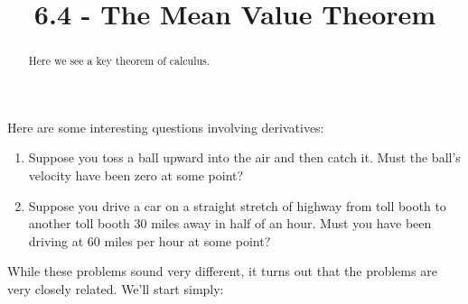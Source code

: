 \documentclass{ximera}
\title{6.4 - The Mean Value Theorem}
\begin{document}
\begin{abstract}
  Here we see a key theorem of calculus.
\end{abstract}
\maketitle


Here are some interesting questions involving derivatives:

\begin{enumerate}
\item Suppose you toss a ball upward into the air and then catch it. Must the
  ball's  velocity have been zero at some point?
\item Suppose you drive a car on a straight stretch of highway from toll booth to
  another toll booth $30$ miles away in half of an hour. Must you have
  been driving at $60$ miles per hour at some point?
\end{enumerate}

While these problems sound very different, it turns out that the
problems are very closely related. We'll start simply:
\end{document}

